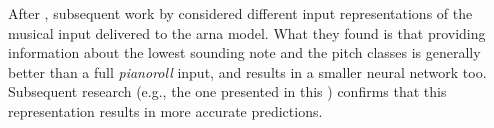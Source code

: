 
After \textcite{chen2018functional}, subsequent work by
\textcite{micchi2020not} considered different input
representations of the musical input delivered to the
\gls{arna} model. What they found is that providing
information about the lowest sounding note and the pitch
classes is generally better than a full \emph{pianoroll}
input, and results in a smaller neural network too.
Subsequent research (e.g., the one presented in this
\thesisdiss{}) confirms that this representation results in
more accurate predictions.
